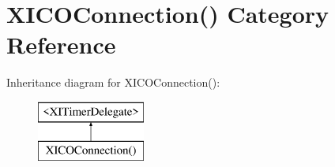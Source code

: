 \hypertarget{category_x_i_c_o_connection_07_08}{}\section{X\+I\+C\+O\+Connection() Category Reference}
\label{category_x_i_c_o_connection_07_08}
Inheritance diagram for X\+I\+C\+O\+Connection()\+:\begin{figure}[H]
\begin{center}
\leavevmode
\includegraphics[height=2.000000cm]{category_x_i_c_o_connection_07_08}
\end{center}
\end{figure}
